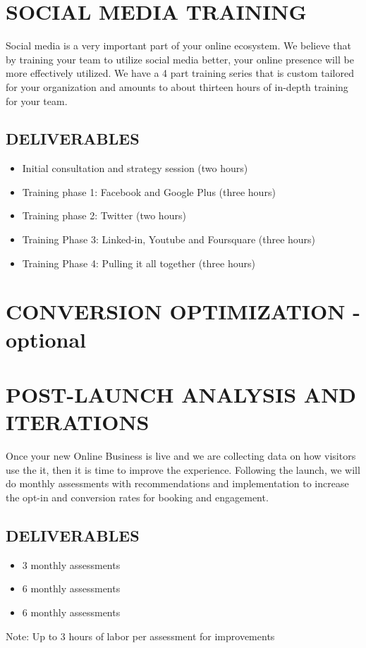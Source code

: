 \documentclass[12pt]{report}
\begin{document}
\section{SOCIAL MEDIA TRAINING}
\item Social media is a very important part of your online ecosystem. We believe that by training your team to utilize social media better, your online presence will be more effectively utilized. We have a 4 part training series that is custom tailored for your organization and amounts to about thirteen hours of in-depth training for your team.
\subsection{DELIVERABLES}
\begin{itemize}
\item Initial consultation and strategy session (two hours)
\item Training phase 1: Facebook and Google Plus (three hours)
\item Training phase 2: Twitter (two hours)
\item Training Phase 3: Linked-in, Youtube and Foursquare (three hours)
\item Training Phase 4: Pulling it all together (three hours)
\end{itemize}

\section{CONVERSION OPTIMIZATION - optional}

\section{POST-LAUNCH ANALYSIS AND ITERATIONS}
\item Once your new Online Business is live and we are collecting data on how visitors use the it, then it is time to improve the experience. Following the launch, we will do monthly assessments with recommendations and implementation to increase the opt-in and conversion rates for booking and engagement.
\subsection{DELIVERABLES}
\begin{itemize}
\item 3 monthly assessments
\item 6 monthly assessments
\item 6 monthly assessments
\end{itemize}
\item Note: Up to 3 hours of labor per assessment for improvements
\end{document}
